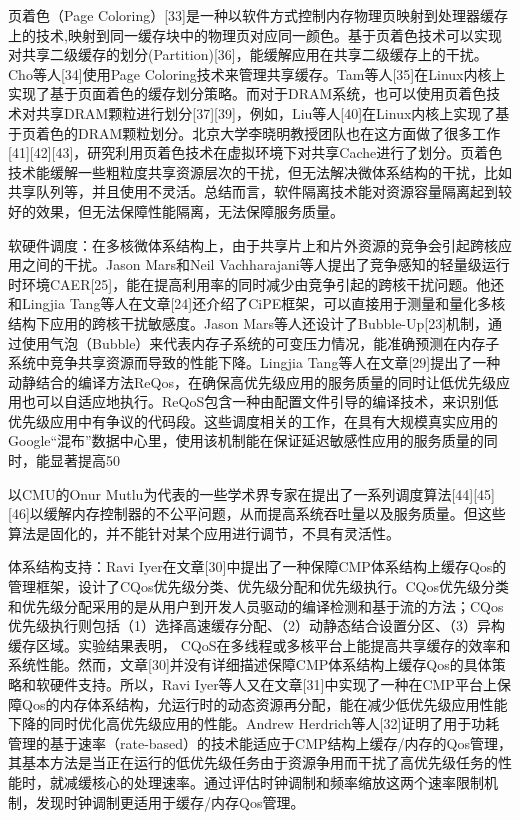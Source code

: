 页着色（Page Coloring）[33]是一种以软件方式控制内存物理页映射到处理器缓存上的技术,映射到同一缓存块中的物理页对应同一颜色。基于页着色技术可以实现对共享二级缓存的划分(Partition)[36]，能缓解应用在共享二级缓存上的干扰。Cho等人[34]使用Page Coloring技术来管理共享缓存。Tam等人[35]在Linux内核上实现了基于页面着色的缓存划分策略。而对于DRAM系统，也可以使用页着色技术对共享DRAM颗粒进行划分[37][39]，例如，Liu等人[40]在Linux内核上实现了基于页着色的DRAM颗粒划分。北京大学李晓明教授团队也在这方面做了很多工作[41][42][43]，研究利用页着色技术在虚拟环境下对共享Cache进行了划分。页着色技术能缓解一些粗粒度共享资源层次的干扰，但无法解决微体系结构的干扰，比如共享队列等，并且使用不灵活。总结而言，软件隔离技术能对资源容量隔离起到较好的效果，但无法保障性能隔离，无法保障服务质量。

软硬件调度：在多核微体系结构上，由于共享片上和片外资源的竞争会引起跨核应用之间的干扰。Jason Mars和Neil Vachharajani等人提出了竞争感知的轻量级运行时环境CAER[25]，能在提高利用率的同时减少由竞争引起的跨核干扰问题。他还和Lingjia Tang等人在文章[24]还介绍了CiPE框架，可以直接用于测量和量化多核结构下应用的跨核干扰敏感度。Jason Mars等人还设计了Bubble-Up[23]机制，通过使用气泡（Bubble）来代表内存子系统的可变压力情况，能准确预测在内存子系统中竞争共享资源而导致的性能下降。Lingjia Tang等人在文章[29]提出了一种动静结合的编译方法ReQos，在确保高优先级应用的服务质量的同时让低优先级应用也可以自适应地执行。ReQoS包含一种由配置文件引导的编译技术，来识别低优先级应用中有争议的代码段。这些调度相关的工作，在具有大规模真实应用的Google“混布”数据中心里，使用该机制能在保证延迟敏感性应用的服务质量的同时，能显著提高50%

以CMU的Onur Mutlu为代表的一些学术界专家在提出了一系列调度算法[44][45][46]以缓解内存控制器的不公平问题，从而提高系统吞吐量以及服务质量。但这些算法是固化的，并不能针对某个应用进行调节，不具有灵活性。

体系结构支持：Ravi Iyer在文章[30]中提出了一种保障CMP体系结构上缓存Qos的管理框架，设计了CQos优先级分类、优先级分配和优先级执行。CQos优先级分类和优先级分配采用的是从用户到开发人员驱动的编译检测和基于流的方法；CQos优先级执行则包括（1）选择高速缓存分配、（2）动静态结合设置分区、（3）异构缓存区域。实验结果表明， CQoS在多线程或多核平台上能提高共享缓存的效率和系统性能。然而，文章[30]并没有详细描述保障CMP体系结构上缓存Qos的具体策略和软硬件支持。所以，Ravi Iyer等人又在文章[31]中实现了一种在CMP平台上保障Qos的内存体系结构，允运行时的动态资源再分配，能在减少低优先级应用性能下降的同时优化高优先级应用的性能。Andrew Herdrich等人[32]证明了用于功耗管理的基于速率（rate-based）的技术能适应于CMP结构上缓存/内存的Qos管理，其基本方法是当正在运行的低优先级任务由于资源争用而干扰了高优先级任务的性能时，就减缓核心的处理速率。通过评估时钟调制和频率缩放这两个速率限制机制，发现时钟调制更适用于缓存/内存Qos管理。

